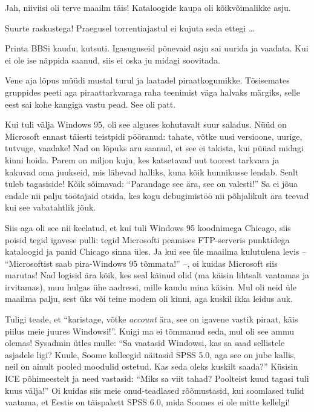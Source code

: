 
Jah, niiviisi oli terve maailm täis! Kataloogide kaupa oli kõikvõimalikke asju.


Suurte raskustega! Praegusel torrentiajastul ei kujuta seda ettegi \ldots


Printa BBSi kaudu, kutsuti. Igasuguseid põnevaid asju sai uurida ja vaadata. Kui ei ole ise näppida saanud, siis ei oska ju midagi soovitada.

Vene aja lõpus müüdi mustal turul ja laatadel piraatkogumikke. Tõsisemates gruppides peeti aga
piraattarkvaraga raha teenimist 
väga halvaks märgiks, selle eest sai kohe kangiga vastu 
pead. See oli patt. 

Kui tuli välja Windows 95, oli see alguses kohutavalt suur saladus. Nüüd on 
Microsoft ennast täiesti teistpidi pööranud: tahate, võtke uusi versioone, 
uurige, tutvuge, vaadake! Nad on lõpuks aru saanud, et see ei takista, kui püüad midagi 
kinni hoida. Parem on miljon kuju, kes katsetavad uut 
toorest tarkvara ja kakuvad oma juukseid, mis lähevad 
halliks, kuna kõik hunnikusse lendab. Sealt tuleb tagasiside! Kõik sõimavad: 
\enquote{Parandage see ära, see on valesti!} Sa ei jõua endale nii palju 
töötajaid otsida, kes kogu debugimistöö nii põhjalikult ära teevad 
kui see vabatahtlik jõuk. 

Siis aga oli see nii keelatud, et kui tuli 
Windows 95 koodnimega Chicago, siis 
poisid tegid igavese pulli: tegid Microsofti peamises FTP-serveris 
punktidega kataloogid ja panid Chicago sinna üles. Ja 
kui see üle maailma kulutulena levis -- \enquote{Microsoftist saab pira-Windows 
95 tõmmata!} --, oi kuidas Microsoft siis marutas! Nad logisid ära kõik, kes seal käinud 
olid (ma käisin lihtsalt vaatamas ja irvitamas), muu hulgas ühe aadressi, mille kaudu 
mina käisin. Mul oli neid üle maailma palju, sest üks või teine modem oli kinni, aga
kuskil ikka leidus auk. 

Tuligi teade, et \enquote{karistage, võtke 
\emph{account} ära, see on igavene vastik piraat, käis piilus meie juures 
Windowsi!}. Kuigi ma ei tõmmanud seda, mul oli see ammu olemas! Sysadmin ütles mulle:
\enquote{Sa vaatasid Windowsi, kas sa saad sellistele asjadele ligi? Kuule, Soome kolleegid näitasid SPSS 5.0, aga see on jube kallis, neil 
on ainult pooled moodulid ostetud. Kas seda oleks kuskilt saada?} Küsisin ICE 
põhimeestelt ja need vastasid: \enquote{Miks sa viit tahad? 
Poolteist kuud tagasi tuli kuus välja!} Oi kuidas siis meie onud-teadlased 
rõõmustasid, kui soomlased tulid vaatama, et Eestis on täispakett SPSS 
6.0, mida Soomes ei ole mitte kellelgi! 

